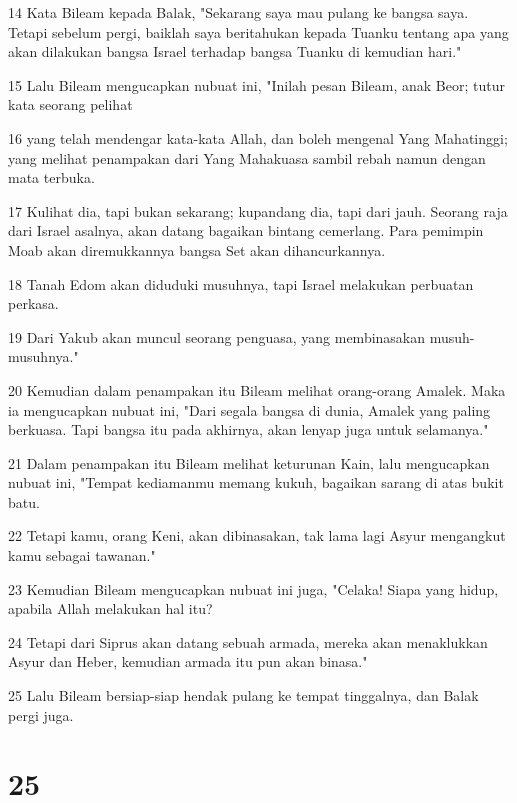 \par 14 Kata Bileam kepada Balak, "Sekarang saya mau pulang ke bangsa saya. Tetapi sebelum pergi, baiklah saya beritahukan kepada Tuanku tentang apa yang akan dilakukan bangsa Israel terhadap bangsa Tuanku di kemudian hari."
\par 15 Lalu Bileam mengucapkan nubuat ini, "Inilah pesan Bileam, anak Beor; tutur kata seorang pelihat
\par 16 yang telah mendengar kata-kata Allah, dan boleh mengenal Yang Mahatinggi; yang melihat penampakan dari Yang Mahakuasa sambil rebah namun dengan mata terbuka.
\par 17 Kulihat dia, tapi bukan sekarang; kupandang dia, tapi dari jauh. Seorang raja dari Israel asalnya, akan datang bagaikan bintang cemerlang. Para pemimpin Moab akan diremukkannya bangsa Set akan dihancurkannya.
\par 18 Tanah Edom akan diduduki musuhnya, tapi Israel melakukan perbuatan perkasa.
\par 19 Dari Yakub akan muncul seorang penguasa, yang membinasakan musuh-musuhnya."
\par 20 Kemudian dalam penampakan itu Bileam melihat orang-orang Amalek. Maka ia mengucapkan nubuat ini, "Dari segala bangsa di dunia, Amalek yang paling berkuasa. Tapi bangsa itu pada akhirnya, akan lenyap juga untuk selamanya."
\par 21 Dalam penampakan itu Bileam melihat keturunan Kain, lalu mengucapkan nubuat ini, "Tempat kediamanmu memang kukuh, bagaikan sarang di atas bukit batu.
\par 22 Tetapi kamu, orang Keni, akan dibinasakan, tak lama lagi Asyur mengangkut kamu sebagai tawanan."
\par 23 Kemudian Bileam mengucapkan nubuat ini juga, "Celaka! Siapa yang hidup, apabila Allah melakukan hal itu?
\par 24 Tetapi dari Siprus akan datang sebuah armada, mereka akan menaklukkan Asyur dan Heber, kemudian armada itu pun akan binasa."
\par 25 Lalu Bileam bersiap-siap hendak pulang ke tempat tinggalnya, dan Balak pergi juga.

\chapter{25}

